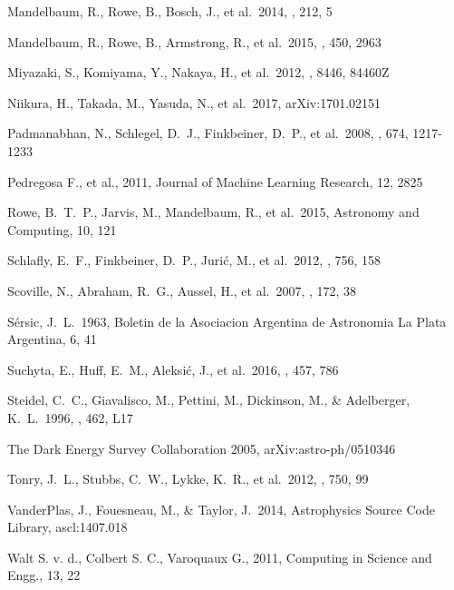 \documentclass[useamsfonts]{pasj01}
\begin{document}
\begin{thebibliography}{}
     Mandelbaum, R., Rowe, B., 
            Bosch, J., et al.\ 2014, \apjs, 212, 5 
    
     Mandelbaum, R., Rowe, B., 
             Armstrong, R., et al.\ 2015, \mnras, 450, 2963 
    
     Miyazaki, S., Komiyama, Y., Nakaya, 
             H., et al.\ 2012, \procspie, 8446, 84460Z 

     Niikura, H., Takada, M., Yasuda, N., 
             et al.\ 2017, arXiv:1701.02151 
             
     Padmanabhan, N., Schlegel, 
             D.~J., Finkbeiner, D.~P., et al.\ 2008, \apj, 674, 1217-1233   
                 
     Pedregosa F., et al., 2011, 
             Journal of Machine Learning Research, 12, 2825     
                 
     Rowe, B.~T.~P., Jarvis, M., Mandelbaum, R., 
             et al.\ 2015, Astronomy and Computing, 10, 121 

     Schlafly, E.~F., Finkbeiner, D.~P.,
             Juri{\'c}, M., et al.\ 2012, \apj, 756, 158 
 
     Scoville, N., Abraham, R.~G., 
             Aussel, H., et al.\ 2007, \apjs, 172, 38 
        
     S{\'e}rsic, J.~L.\ 1963, Boletin de la 
             Asociacion Argentina de Astronomia La Plata Argentina, 6, 41 
            
     Suchyta, E., Huff, E.~M., Aleksi{\'c}, 
             J., et al.\ 2016, \mnras, 457, 786   

     Steidel, C.~C., Giavalisco, M., 
             Pettini, M., Dickinson, M., \& Adelberger, K.~L.\ 1996, \apjl, 462, L17 
    
     The Dark Energy 
             Survey Collaboration 2005, arXiv:astro-ph/0510346     

     Tonry, J.~L., Stubbs, C.~W., Lykke, K.~R., 
             et al.\ 2012, \apj, 750, 99     
             
     VanderPlas, J., Fouesneau, M., \& 
             Taylor, J.\ 2014, Astrophysics Source Code Library, ascl:1407.018 
     
     Walt S. v. d., Colbert S. C., Varoquaux G., 
             2011, Computing in Science and Engg., 13, 22 
                    
\end{thebibliography}
\end{document}
